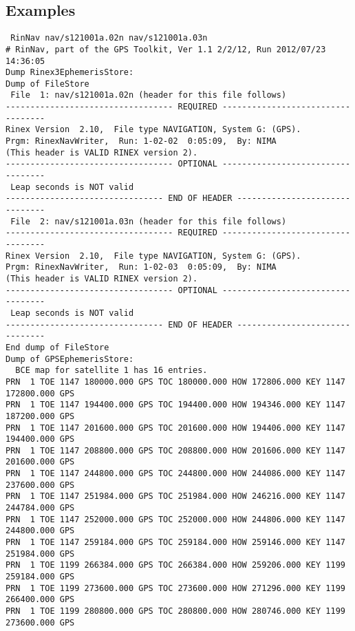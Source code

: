 \subsection{Examples}
\begin{verbatim}
 RinNav nav/s121001a.02n nav/s121001a.03n
# RinNav, part of the GPS Toolkit, Ver 1.1 2/2/12, Run 2012/07/23 14:36:05
Dump Rinex3EphemerisStore:
Dump of FileStore
 File  1: nav/s121001a.02n (header for this file follows)
---------------------------------- REQUIRED ----------------------------------
Rinex Version  2.10,  File type NAVIGATION, System G: (GPS).
Prgm: RinexNavWriter,  Run: 1-02-02  0:05:09,  By: NIMA
(This header is VALID RINEX version 2).
---------------------------------- OPTIONAL ----------------------------------
 Leap seconds is NOT valid
-------------------------------- END OF HEADER -------------------------------
 File  2: nav/s121001a.03n (header for this file follows)
---------------------------------- REQUIRED ----------------------------------
Rinex Version  2.10,  File type NAVIGATION, System G: (GPS).
Prgm: RinexNavWriter,  Run: 1-02-03  0:05:09,  By: NIMA
(This header is VALID RINEX version 2).
---------------------------------- OPTIONAL ----------------------------------
 Leap seconds is NOT valid
-------------------------------- END OF HEADER -------------------------------
End dump of FileStore
Dump of GPSEphemerisStore:
  BCE map for satellite 1 has 16 entries.
PRN  1 TOE 1147 180000.000 GPS TOC 180000.000 HOW 172806.000 KEY 1147 172800.000 GPS
PRN  1 TOE 1147 194400.000 GPS TOC 194400.000 HOW 194346.000 KEY 1147 187200.000 GPS
PRN  1 TOE 1147 201600.000 GPS TOC 201600.000 HOW 194406.000 KEY 1147 194400.000 GPS
PRN  1 TOE 1147 208800.000 GPS TOC 208800.000 HOW 201606.000 KEY 1147 201600.000 GPS
PRN  1 TOE 1147 244800.000 GPS TOC 244800.000 HOW 244086.000 KEY 1147 237600.000 GPS
PRN  1 TOE 1147 251984.000 GPS TOC 251984.000 HOW 246216.000 KEY 1147 244784.000 GPS
PRN  1 TOE 1147 252000.000 GPS TOC 252000.000 HOW 244806.000 KEY 1147 244800.000 GPS
PRN  1 TOE 1147 259184.000 GPS TOC 259184.000 HOW 259146.000 KEY 1147 251984.000 GPS
PRN  1 TOE 1199 266384.000 GPS TOC 266384.000 HOW 259206.000 KEY 1199 259184.000 GPS
PRN  1 TOE 1199 273600.000 GPS TOC 273600.000 HOW 271296.000 KEY 1199 266400.000 GPS
PRN  1 TOE 1199 280800.000 GPS TOC 280800.000 HOW 280746.000 KEY 1199 273600.000 GPS

\end{verbatim}

%
